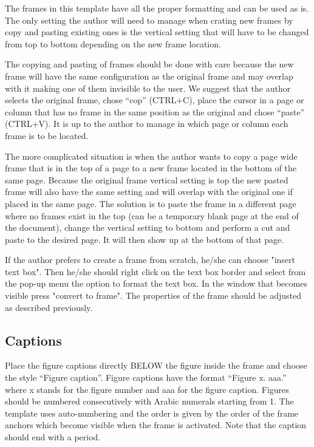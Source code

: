 \documentclass[final]{imeko_acta}
\begin{document}
The frames in this template have all the proper formatting and can be used as is. The only setting the author will need to manage when crating new frames by copy and pasting existing ones is the vertical setting that will have to be changed from top to bottom depending on the new frame location.

The copying and pasting of frames should be done with care because the new frame will have the same configuration as the original frame and may overlap with it making one of them invisible to the user. We suggest that the author selects the original frame, chose ``cop'' (CTRL+C), place the cursor in a page or column that has no frame in the same position as the original and chose “paste” (CTRL+V). It is up to the author to manage in which page or column each frame is to be located.

The more complicated situation is when the author wants to copy a page wide frame that is in the top of a page to a new frame located in the bottom of the same page. Because the original frame vertical setting is top the new pasted frame will also have the same setting and will overlap with the original one if placed in the same page. The solution is to paste the frame in a different page where no frames exist in the top (can be a temporary blank page at the end of the document), change the vertical setting to bottom and perform a cut and paste to the desired page. It will then show up at the bottom of that page.

If the author prefers to create a frame from scratch, he/she can choose "insert text box". Then he/she should right click on the text box border and select from the pop-up menu the option to format the text box. In the window that becomes visible press "convert to frame". The properties of the frame should be adjusted as described previously.

\subsection{Captions}

Place the figure captions directly BELOW the figure inside the frame and choose the style “Figure caption”. Figure captions have the format “Figure x. aaa.” where x stands for the figure number and aaa for the figure caption. Figures should be numbered consecutively with Arabic numerals starting from 1. The template uses auto-numbering and the order is given by the
	order of the frame anchors which become visible when the
	frame is activated. Note that the caption should end with a
	period.
\end{document}
